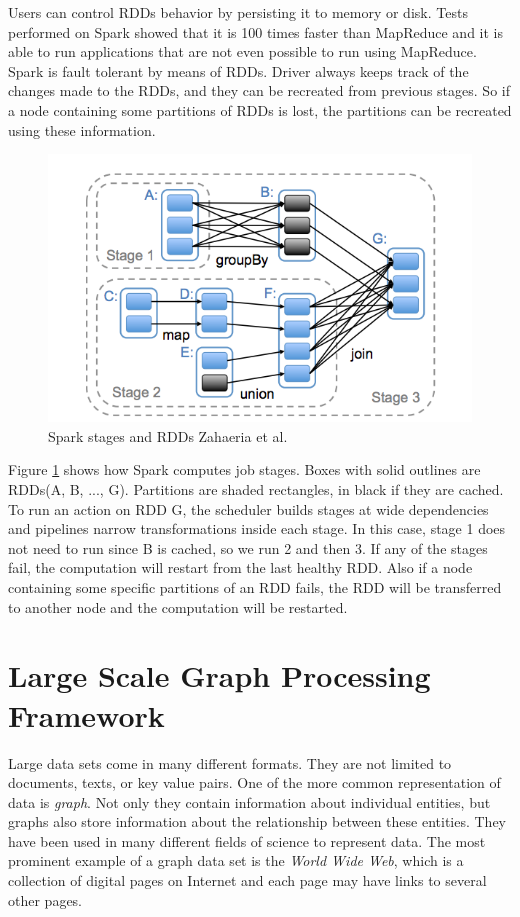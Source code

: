 \documentclass[english]{tktltiki}
\begin{document}
Users can control RDDs behavior by persisting it to memory or disk. 
Tests performed on Spark showed that it is 100 times faster than MapReduce and it is able to run applications that are not even possible to run using MapReduce. 
Spark is fault tolerant by means of RDDs. 
Driver always keeps track of the changes made to the RDDs, and they can be recreated from previous stages. 
So if a node containing some partitions of RDDs is lost, the partitions can be recreated using these information. 
 
\begin{figure}[ht!]
\centering
\includegraphics[width=150mm]{figures/rdd.png}
\caption[]{Spark stages and RDDs  Zahaeria et al.\ \cite{zaharia12} }
\label{fig:rdd}
\end{figure}

Figure \ref{fig:rdd} shows how Spark computes job stages. 
Boxes with solid outlines are RDDs(A, B, ..., G). 
Partitions are shaded rectangles, in black if they are cached. 
To run an action on RDD G, the scheduler builds stages at wide dependencies and pipelines narrow transformations inside each stage. 
In this case, stage 1 does not need to run since B is cached, so we run 2 and then 3. 
If any of the stages fail, the computation will restart from the last healthy RDD. 
Also if a node containing some specific partitions of an RDD fails, the RDD will be transferred to another node and the computation will be restarted. 

\newpage

\section{Large Scale Graph Processing Framework}
\label{sec:biggraph}
Large data sets come in many different formats. 
They are not limited to documents, texts, or key value pairs. 
One of the more common representation of data is \textit{graph}. 
Not only they contain information about individual entities, but graphs also store information about the relationship between these entities. They have been used in many different fields of science to represent data. 
The most prominent example of a graph data set is the \textit{World Wide Web}, which is a collection of digital pages on Internet and each page may have links to several other pages. 
\end{document}
